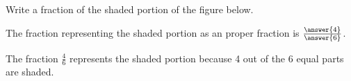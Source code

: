 \documentclass{ximera}
\begin{document}
\begin{problem}
 
Write a fraction of the shaded portion of the figure below.
 
\begin{center}
\end{center}
 
The fraction representing the shaded portion as an proper fraction is $\frac{\answer{4}}{\answer{6}}$.
\begin{feedback}
The fraction $\frac{4}{6}$ represents the shaded portion because 4 out of the 6 equal parts are shaded.
\end{feedback}

\end{problem}
 
\end{document}
